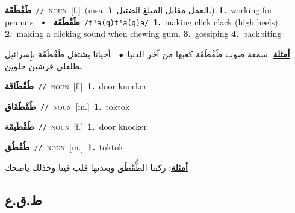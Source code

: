 \documentclass[10pt,a4paper,twoside]{article} %
\begin{document}
\begin{multicols}{2}
{\setlength\topsep{0pt}\textbf{\foreignlanguage{arabic}{طَقْطَقَة}}\ {\color{gray}\texttt{//}\color{black}}\ \textsc{noun}\ [f.]\ \color{gray}(msa. \foreignlanguage{arabic}{العمل مقابل المبلغ الضئيل}~\foreignlanguage{arabic}{\textbf{١.}})\color{black}\ \textbf{1.}~working for peanuts\ \ $\smblkdiamond$\ \ \setlength\topsep{0pt}\textbf{\foreignlanguage{arabic}{طَقْطَقَة}}\ {\color{gray}\texttt{/tˤa(q)tˤa(q)a/}\color{black}}\ \textbf{1.}~making click clack (high heels).  \textbf{2.}~making a clicking sound when chewing gum.  \textbf{3.}~gossiping  \textbf{4.}~backbiting\  \begin{flushright}\color{gray}\foreignlanguage{arabic}{\textbf{\underline{\foreignlanguage{arabic}{أمثلة}}}: سمعة صوت طَقْطَقَة كعبها من آخر الدنيا\ $\bullet$\ \  أحيانا بشتغل طَقْطَقَة بإِسرائيل بطلعلي قرشين حلوين}\end{flushright}\color{black}} \vspace{2mm}

{\setlength\topsep{0pt}\textbf{\foreignlanguage{arabic}{طُقْطَاقَة}}\ {\color{gray}\texttt{//}\color{black}}\ \textsc{noun}\ [f.]\ \textbf{1.}~door knocker\ } \vspace{2mm}

{\setlength\topsep{0pt}\textbf{\foreignlanguage{arabic}{طُقْطَقَاق}}\ {\color{gray}\texttt{//}\color{black}}\ \textsc{noun}\ [m.]\ \textbf{1.}~toktok\ } \vspace{2mm}

{\setlength\topsep{0pt}\textbf{\foreignlanguage{arabic}{طُقْطَيقَة}}\ {\color{gray}\texttt{//}\color{black}}\ \textsc{noun}\ [f.]\ \textbf{1.}~door knocker\ } \vspace{2mm}

{\setlength\topsep{0pt}\textbf{\foreignlanguage{arabic}{طُقْطُق}}\ {\color{gray}\texttt{//}\color{black}}\ \textsc{noun}\ [m.]\ \textbf{1.}~toktok\  \begin{flushright}\color{gray}\foreignlanguage{arabic}{\textbf{\underline{\foreignlanguage{arabic}{أمثلة}}}: ركبنا الطُّقْطُق وبعديها قلب فينا وخذلك ياضحك}\end{flushright}\color{black}} \vspace{2mm}

\vspace{-3mm}
\subsection*{\color{blue}\foreignlanguage{arabic}{ط.ق.ع}\color{blue}{}} 


\end{multicols}
\end{document}
